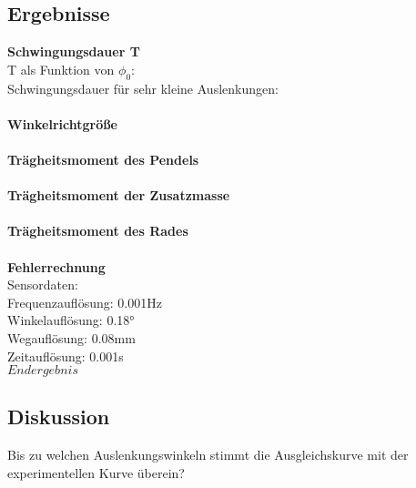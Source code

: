 \documentclass{article}
\begin{document}
\subsection{Ergebnisse}
\textbf{Schwingungsdauer T}\\
T als Funktion von $\phi_0$: \\
Schwingungsdauer für sehr kleine Auslenkungen:\\
\\
\textbf{Winkelrichtgröße}\\
\\
\textbf{Trägheitsmoment des Pendels}\\
\\
\textbf{Trägheitsmoment der Zusatzmasse}\\
\\
\textbf{Trägheitsmoment des Rades}\\
\\
\textbf{Fehlerrechnung}\\
Sensordaten:\\
Frequenzauflösung: 0.001Hz\\
Winkelauflösung: 0.18°\\
Wegauflösung: 0.08mm\\
Zeitauflösung: 0.001s\\
$\boxed{Endergebnis}$ %
\subsection{Diskussion}
Bis zu welchen Auslenkungswinkeln stimmt die Ausgleichskurve mit der experimentellen Kurve überein? 
\end{document}
